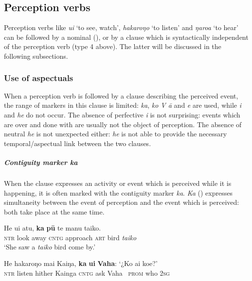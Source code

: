 \subsection{Perception verbs}\label{sec:11.3.1}
Perception verbs like \textit{u{\ꞌ}i} ‘to see, watch’, \textit{hakaroŋo} ‘to listen’ and \textit{ŋaro{\ꞌ}a} ‘to hear’ can be followed by a nominal  (), or by a clause which is syntactically independent of the perception verb (type 4 above). The latter will be discussed in the following subsections.

\subsubsection[Use of aspectuals ]{Use of aspectuals} \label{sec:11.3.1.1}

When a perception verb is followed by a clause describing the perceived event, the range of  markers in this clause is limited: \textit{ka}, \textit{ko V {\ꞌ}ā} and \textit{e} are used, while \textit{i} and \textit{he} do not occur. The absence of perfective \textit{i} is not surprising: events which are over and done with are usually not the object of perception. The absence of neutral \textit{he} is not unexpected either: \textit{he} is not able to provide the necessary temporal/aspectual link between the two clauses.

\subparagraph{Contiguity marker \textit{ka}} When the clause expresses an activity or event which is perceived while it is happening, it is often marked with the contiguity marker \textit{ka}. \textit{Ka} () expresses simultaneity between the event of perception and the event which is perceived: both take place at the same time. 

\ea\label{ex:11.33}
\gll He u{\ꞌ}i atu, \textbf{ka} \textbf{pū} te manu taiko. \\
\textsc{ntr} look away \textsc{cntg} approach \textsc{art} bird \textit{taiko} \\

\glt 
‘She saw a \textit{taiko} bird come by.’ \textstyleExampleref{[Ley-9-55.078]}
\z

\ea\label{ex:11.34}
\gll He hakaroŋo mai Kaiŋa, \textbf{ka} \textbf{{\ꞌ}ui} \textbf{Vaha}: ‘¿Ko ai koe?’\\
\textsc{ntr} listen hither Kainga \textsc{cntg} ask Vaha ~\textsc{prom} who \textsc{2sg}\\

